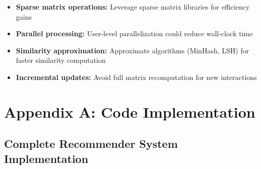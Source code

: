 \documentclass[12pt,a4paper]{article}
\begin{document}
\begin{itemize}
    \item \textbf{Sparse matrix operations:} Leverage sparse matrix libraries for efficiency gains
    \item \textbf{Parallel processing:} User-level parallelization could reduce wall-clock time
    \item \textbf{Similarity approximation:} Approximate algorithms (MinHash, LSH) for faster similarity computation
    \item \textbf{Incremental updates:} Avoid full matrix recomputation for new interactions
\end{itemize}

\appendix

\section{Appendix A: Code Implementation}

\subsection{Complete Recommender System Implementation}
\end{document}
